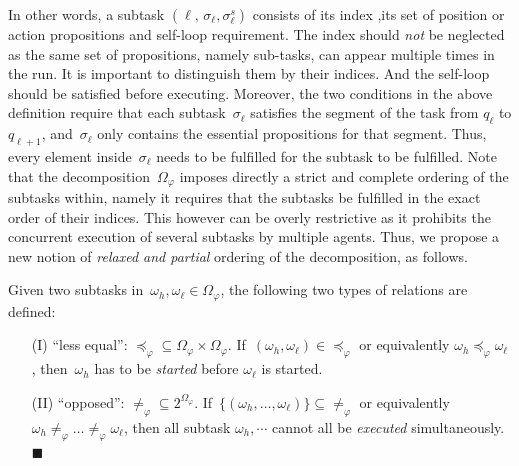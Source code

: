 In other words, a subtask $(\ell,\,\sigma_\ell,\sigma^s_\ell)$ consists of its index
,its set of position or action propositions and self-loop requirement.
The index should \emph{not} be neglected as the same set of propositions, namely sub-tasks,
can appear multiple times in the run.
It is important to distinguish them by their indices. And the self-loop should be satisfied 
before executing.
Moreover, the two conditions in the above definition require that
each subtask~$\sigma_\ell$ satisfies the segment of the task from $q_\ell$ to $q_{\ell+1}$,
and~$\sigma_\ell$ only contains the {essential} propositions for that segment.
Thus, every element inside~$\sigma_\ell$ needs to be fulfilled for the subtask to be fulfilled.
Note that the decomposition~$\Omega_{\varphi}$ imposes directly a {strict and complete} ordering of the subtasks within,
namely it requires that the subtasks be fulfilled in the exact order of their indices.
This however can be overly restrictive as it prohibits the concurrent execution of several subtasks by multiple agents.
Thus, we propose a new notion of \emph{relaxed and partial} ordering of the decomposition,
as follows.

\begin{definition}\label{def:partial}
Given two subtasks in~$\omega_h,
\omega_\ell\in \Omega_{\varphi}$,
the following two types of relations are defined:
\begin{itemize}
\item[(I)] ``less equal'': $\preceq_{\varphi}\subseteq \Omega_{\varphi} \times \Omega_{\varphi}$.
If~$(\omega_h, \omega_\ell)\in \preceq_{\varphi}$ or
equivalently $\omega_h\preceq_{\varphi}\omega_\ell$,
then~$\omega_h$ has to be \emph{started} before $\omega_\ell$ is started.
\item[(II)] ``opposed'': $\neq_{\varphi}\subseteq 2^{\Omega_{\varphi}}$.
If~$\{(\omega_h,\dots,\omega_\ell)\}\subseteq \neq_{\varphi}$
or equivalently $\omega_h\neq_{\varphi}\dots\neq_{\varphi}\omega_\ell$,
then all subtask $\omega_h,\cdots$ cannot all be \emph{executed} simultaneously. 
\hfill $\blacksquare$
\end{itemize}
\end{definition}

